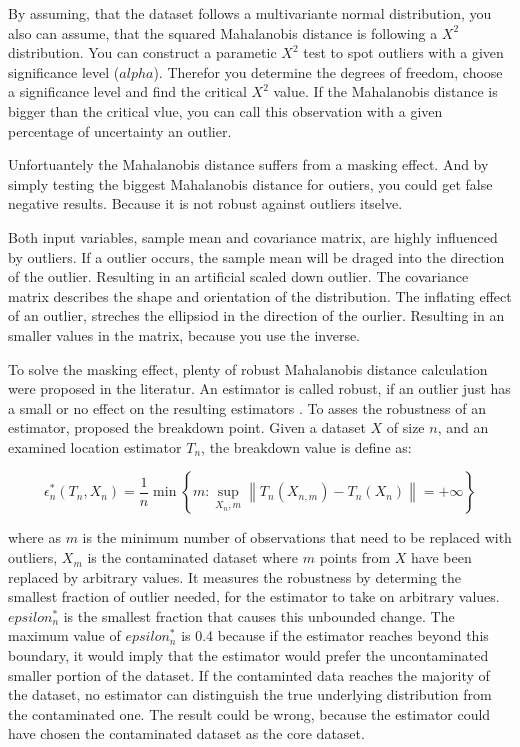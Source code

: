 By assuming, that the dataset follows a multivariante normal distribution, you also can assume, that the squared Mahalanobis distance is following a $X^2$ distribution.
You can construct a parametic $X^2$ test to spot outliers with a given significance level ($alpha$). 
Therefor you determine the degrees of freedom, choose a significance level and find the critical $X^2$ value.
If the Mahalanobis distance is bigger than the critical vlue, you can call this observation with a given percentage of uncertainty an outlier. 

Unfortuantely the Mahalanobis distance suffers from a masking effect.
And by simply testing the biggest Mahalanobis distance for outiers, you could get false negative results.
Because it is not robust against outliers itselve.

Both input variables, sample mean and covariance matrix, are highly influenced by outliers.
If a outlier occurs, the sample mean will be draged into the direction of the outlier.
Resulting in an artificial scaled down outlier. 
The covariance matrix describes the shape and orientation of the distribution.
The inflating effect of an outlier, streches the ellipsiod in the direction of the ourlier. 
Resulting in an smaller values in the matrix, because you use the inverse.

To solve the masking effect, plenty of robust Mahalanobis distance calculation were proposed in the literatur.
An estimator is called robust, if an outlier just has a small or no effect on the resulting estimators . 
To asses the robustness of an estimator, \citet{hampel1971general} proposed the breakdown point.
Given a dataset $X$ of size $n$, and an examined location estimator $T_n$, the breakdown value is define as:

\begin{equation}
    \epsilon_{n}^{*}(T_{n}, X_{n}) = \frac{1}{n} \min \left\{ m : \sup_{X_{n},{m}} \left\| T_{n}(X_{n,m}) - T_{n}(X_{n}) \right\| = +\infty \right\}
\end{equation}

where as $m$ is the minimum number of observations that need to be replaced with outliers, $X_m$ is the contaminated dataset where $m$ points from $X$ have been replaced by arbitrary values.
It measures the robustness by determing the smallest fraction of outlier needed, for the estimator to take on arbitrary values.
$epsilon_n^*$ is the smallest fraction that causes this unbounded change. 
The maximum value of $epsilon_n^*$ is 0.4 because if the estimator reaches beyond this boundary, it would imply that the estimator would prefer the uncontaminated smaller portion 
of the dataset. If the contaminted data reaches the majority of the dataset, no estimator can distinguish the true underlying distribution from the contaminated one. 
The result could be wrong, because the estimator could have chosen the contaminated dataset as the core dataset.


